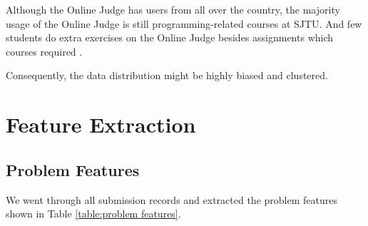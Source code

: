     Although the Online Judge has users from all over the country,
    the majority usage of the Online Judge is still programming-related courses at SJTU.
    And few students do extra exercises on the Online Judge besides assignments which courses required .

    Consequently, the data distribution might be highly biased and clustered.

\section{Feature Extraction}


    \subsection{Problem Features}

        We went through all submission records and extracted the problem features shown in Table \ref{table:problem features}.

